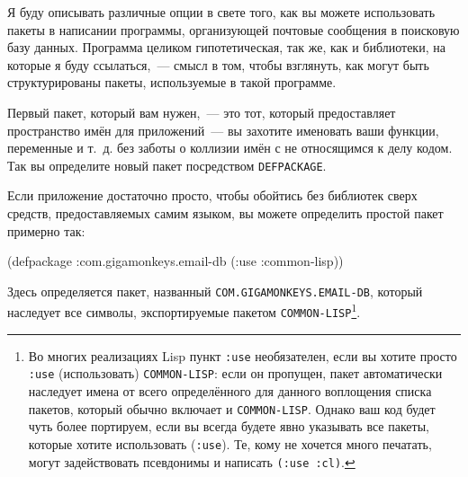 Я буду описывать различные опции в свете того, как вы можете использовать пакеты в
написании программы, организующей почтовые сообщения в поисковую базу данных. Программа
целиком гипотетическая, так же, как и библиотеки, на которые я буду ссылаться,~--- смысл в
том, чтобы взглянуть, как могут быть структурированы пакеты, используемые в такой
программе.

Первый пакет, который вам нужен,~--- это тот, который предоставляет пространство имён для
приложений~--- вы захотите именовать ваши функции, переменные и т.~д. без заботы о
коллизии имён с не относящимся к делу кодом. Так вы определите новый пакет посредством
\lstinline{DEFPACKAGE}.

Если приложение достаточно просто, чтобы обойтись без библиотек сверх средств,
предоставляемых самим языком, вы можете определить простой пакет примерно так:

\begin{myverb}
(defpackage :com.gigamonkeys.email-db
  (:use :common-lisp))
\end{myverb}

Здесь определяется пакет, названный \lstinline{COM.GIGAMONKEYS.EMAIL-DB}, который наследует все
символы, экспортируемые пакетом \lstinline{COMMON-LISP}\footnote{Во многих реализациях Lisp
  пункт \lstinline{:use} необязателен, если вы хотите просто \lstinline{:use} (использовать)
  \lstinline{COMMON-LISP}: если он пропущен, пакет автоматически наследует имена от всего
  определённого для данного воплощения списка пакетов, который обычно включает и
  \lstinline{COMMON-LISP}. Однако ваш код будет чуть более портируем, если вы всегда будете
  явно указывать все пакеты, которые хотите использовать (\lstinline{:use}). Те, кому
  не хочется много печатать, могут задействовать псевдонимы и написать \lstinline{(:use :cl)}.}.

